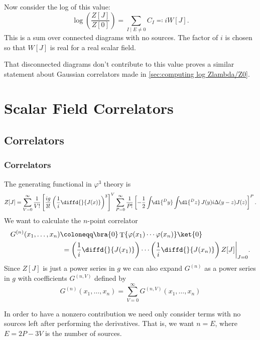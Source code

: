 \documentclass[fleqn]{NotesClass}
\DeclareMathOperator{\timeOrdering}{T}
\begin{document}
    Now consider the log of this value:
    \begin{equation}
        \log\left( \frac{Z[J]}{Z[0]} \right) = \sum_{I \mid E \ne 0} C_I \eqqcolon iW[J].
    \end{equation}
    This is a sum over connected diagrams with no sources.
    The factor of \(i\) is chosen so that \(W[J]\) is real for a real scalar field.
    
    That disconnected diagrams don't contribute to this value proves a similar statement about Gaussian correlators made in \cref{sec:computing log Zlambda/Z0}.
    
    \part{Scalar Field Correlators}
    \chapter{Correlators}
    \section{Correlators}
    The generating functional in \(\varphi^3\) theory is
    \begin{equation*}
        Z[J] = \sum_{V = 0}^{\infty} \frac{1}{V!} \left[ \frac{ig}{3!} \left( \frac{1}{i} \diffd{}{J(x)} \right)^3 \right]^V \sum_{P = 0}^{\infty} \frac{1}{P!} \left[ -\frac{1}{2} \int \!\! \dl{^Dy} \int \!\! \dl{^Dz} \, J(y) i\Delta(y - z) J(z) \right]^P.
    \end{equation*}
    We want to calculate the \(n\)-point correlator
    \begin{align}
        G^{(n)}(x_1, \dotsc, x_n) &\coloneqq \bra{0} \timeOrdering\{\varphi(x_1) \dotsm \varphi(x_n)\} \ket{0}\\
        &\hphantom{:}= \left( \frac{1}{i} \diffd{}{J(x_1)} \right) \dotsm \left( \frac{1}{i} \diffd{}{J(x_n)} \right) Z[J] \bigg|_{J = 0}.
    \end{align}
    Since \(Z[J]\) is just a power series in \(g\) we can also expand \(G^{(n)}\) as a power series in \(g\) with coefficients \(G^{(n, V)}\) defined by
    \begin{equation}
        G^{(n)}(x_1, \dotsc, x_n) = \sum_{V = 0}^{\infty} G^{(n, V)}(x_1, \dotsc, x_n)
    \end{equation}
    
    In order to have a nonzero contribution we need only consider terms with no sources left after performing the derivatives.
    That is, we want \(n = E\), where \(E = 2P - 3V\) is the number of sources.
    
\end{document}
